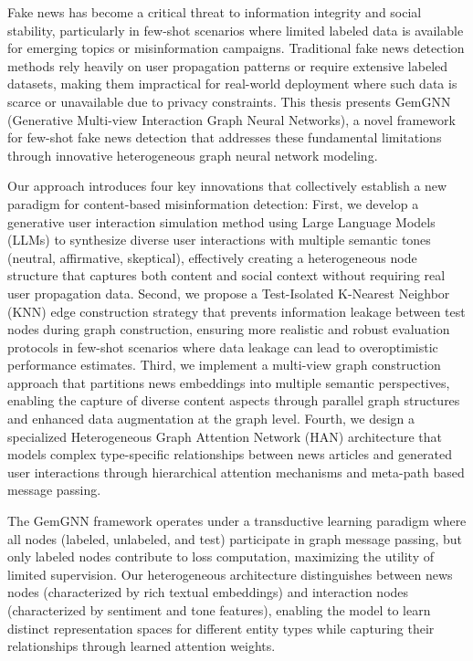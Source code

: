 \StartAbstract

Fake news has become a critical threat to information integrity and social stability, particularly in few-shot scenarios where limited labeled data is available for emerging topics or misinformation campaigns. Traditional fake news detection methods rely heavily on user propagation patterns or require extensive labeled datasets, making them impractical for real-world deployment where such data is scarce or unavailable due to privacy constraints. This thesis presents GemGNN (Generative Multi-view Interaction Graph Neural Networks), a novel framework for few-shot fake news detection that addresses these fundamental limitations through innovative heterogeneous graph neural network modeling.


Our approach introduces four key innovations that collectively establish a new paradigm for content-based misinformation detection: First, we develop a generative user interaction simulation method using Large Language Models (LLMs) to synthesize diverse user interactions with multiple semantic tones (neutral, affirmative, skeptical), effectively creating a heterogeneous node structure that captures both content and social context without requiring real user propagation data. Second, we propose a Test-Isolated K-Nearest Neighbor (KNN) edge construction strategy that prevents information leakage between test nodes during graph construction, ensuring more realistic and robust evaluation protocols in few-shot scenarios where data leakage can lead to overoptimistic performance estimates. Third, we implement a multi-view graph construction approach that partitions news embeddings into multiple semantic perspectives, enabling the capture of diverse content aspects through parallel graph structures and enhanced data augmentation at the graph level. Fourth, we design a specialized Heterogeneous Graph Attention Network (HAN) architecture that models complex type-specific relationships between news articles and generated user interactions through hierarchical attention mechanisms and meta-path based message passing.


The GemGNN framework operates under a transductive learning paradigm where all nodes (labeled, unlabeled, and test) participate in graph message passing, but only labeled nodes contribute to loss computation, maximizing the utility of limited supervision. Our heterogeneous architecture distinguishes between news nodes (characterized by rich textual embeddings) and interaction nodes (characterized by sentiment and tone features), enabling the model to learn distinct representation spaces for different entity types while capturing their relationships through learned attention weights.

